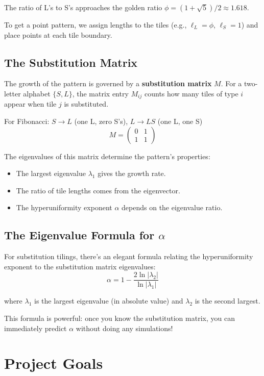 \documentclass[11pt,letterpaper]{article}
\begin{document}
The ratio of L's to S's approaches the golden ratio $\phi = (1+\sqrt{5})/2 \approx 1.618$.

To get a point pattern, we assign lengths to the tiles (e.g., $\ell_L = \phi$, $\ell_S = 1$) and place points at each tile boundary.

\subsection{The Substitution Matrix}

The growth of the pattern is governed by a \textbf{substitution matrix} $M$. For a two-letter alphabet $\{S, L\}$, the matrix entry $M_{ij}$ counts how many tiles of type $i$ appear when tile $j$ is substituted.

For Fibonacci: $S \to L$ (one L, zero S's), $L \to LS$ (one L, one S)
\[
M = \begin{pmatrix} 0 & 1 \\ 1 & 1 \end{pmatrix}
\]

The eigenvalues of this matrix determine the pattern's properties:
\begin{itemize}
    \item The largest eigenvalue $\lambda_1$ gives the growth rate.
    \item The ratio of tile lengths comes from the eigenvector.
    \item The hyperuniformity exponent $\alpha$ depends on the eigenvalue ratio.
\end{itemize}

\subsection{The Eigenvalue Formula for $\alpha$}

For substitution tilings, there's an elegant formula relating the hyperuniformity exponent to the substitution matrix eigenvalues:
\[
\boxed{\alpha = 1 - \frac{2\ln|\lambda_2|}{\ln|\lambda_1|}}
\]

where $\lambda_1$ is the largest eigenvalue (in absolute value) and $\lambda_2$ is the second largest.

This formula is powerful: once you know the substitution matrix, you can immediately predict $\alpha$ without doing any simulations!

\section{Project Goals}
\end{document}
